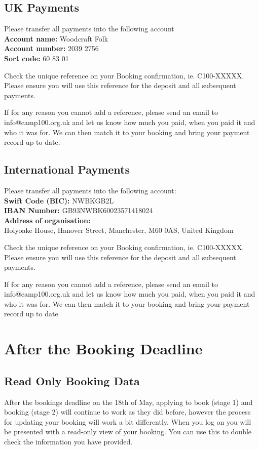 \documentclass[a4paper, 11pt]{report}
\begin{document}
\section{UK Payments}

Please transfer all payments into the following account\\
\textbf{Account name:} Woodcraft Folk\\
\textbf{Account number:} 2039 2756\\
\textbf{Sort code:} 60 83 01

Check the unique reference on your Booking confirmation, ie. C100-XXXXX. Please ensure you will use this reference for the deposit and all subsequent payments.

If for any reason you cannot add a reference, please send an email to info@camp100.org.uk and let us know how much you paid, when you paid it and who it was for. We can then match it to your booking and bring your payment record up to date.

\section{International Payments}

Please transfer all payments into the following account:\\
\textbf{Swift Code (BIC):} NWBKGB2L\\
\textbf{IBAN Number:} GB93NWBK60023571418024\\
\textbf{Address of organisation:} \\
Holyoake House, Hanover Street, Manchester, M60 0AS, United Kingdom

Check the unique reference on your Booking confirmation, ie. C100-XXXXX. Please ensure you will use this reference for the deposit and all subsequent payments. 

If for any reason you cannot add a reference, please send an email to info@camp100.org.uk and let us know how much you paid, when you paid it and who it was for. We can then match it to your booking and bring your payment record up to date

\chapter{After the Booking Deadline}
\section{Read Only Booking Data}
After the bookings deadline on the 18th of May, applying to book (stage 1) and booking (stage 2) will continue to work as they did before, however the process for updating your booking will work a bit differently. When you log on you will be presented with a read-only view of your booking. You can use this to double check the information you have provided. 
\end{document}
